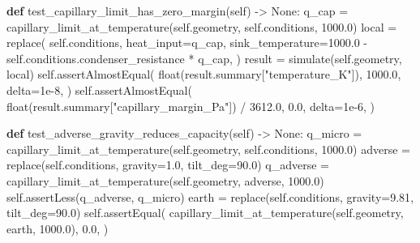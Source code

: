 \documentclass[
  12pt,
  12pt,a4paper,oneside]{report}
\newenvironment{Shaded}{}{}
\newcommand{\BuiltInTok}[1]{\textcolor[rgb]{0.00,0.50,0.00}{#1}}
\newcommand{\FloatTok}[1]{\textcolor[rgb]{0.25,0.63,0.44}{#1}}
\newcommand{\KeywordTok}[1]{\textcolor[rgb]{0.00,0.44,0.13}{\textbf{#1}}}
\newcommand{\NormalTok}[1]{#1}
\newcommand{\OperatorTok}[1]{\textcolor[rgb]{0.40,0.40,0.40}{#1}}
\newcommand{\StringTok}[1]{\textcolor[rgb]{0.25,0.44,0.63}{#1}}
\newcommand{\VariableTok}[1]{\textcolor[rgb]{0.10,0.09,0.49}{#1}}
\begin{document}
\begin{Shaded}
\begin{Highlighting}[]
    \KeywordTok{def}\NormalTok{ test\_capillary\_limit\_has\_zero\_margin(}\VariableTok{self}\NormalTok{) }\OperatorTok{{-}\textgreater{}} \VariableTok{None}\NormalTok{:}
\NormalTok{        q\_cap }\OperatorTok{=}\NormalTok{ capillary\_limit\_at\_temperature(}\VariableTok{self}\NormalTok{.geometry, }\VariableTok{self}\NormalTok{.conditions, }\FloatTok{1000.0}\NormalTok{)}
\NormalTok{        local }\OperatorTok{=}\NormalTok{ replace(}
            \VariableTok{self}\NormalTok{.conditions,}
\NormalTok{            heat\_input}\OperatorTok{=}\NormalTok{q\_cap,}
\NormalTok{            sink\_temperature}\OperatorTok{=}\FloatTok{1000.0} \OperatorTok{{-}} \VariableTok{self}\NormalTok{.conditions.condenser\_resistance }\OperatorTok{*}\NormalTok{ q\_cap,}
\NormalTok{        )}
\NormalTok{        result }\OperatorTok{=}\NormalTok{ simulate(}\VariableTok{self}\NormalTok{.geometry, local)}
        \VariableTok{self}\NormalTok{.assertAlmostEqual(}
            \BuiltInTok{float}\NormalTok{(result.summary[}\StringTok{"temperature\_K"}\NormalTok{]), }\FloatTok{1000.0}\NormalTok{, delta}\OperatorTok{=}\FloatTok{1e{-}8}\NormalTok{,}
\NormalTok{        )}
        \VariableTok{self}\NormalTok{.assertAlmostEqual(}
            \BuiltInTok{float}\NormalTok{(result.summary[}\StringTok{"capillary\_margin\_Pa"}\NormalTok{]) }\OperatorTok{/} \FloatTok{3612.0}\NormalTok{,}
            \FloatTok{0.0}\NormalTok{, delta}\OperatorTok{=}\FloatTok{1e{-}6}\NormalTok{,}
\NormalTok{        )}

    \KeywordTok{def}\NormalTok{ test\_adverse\_gravity\_reduces\_capacity(}\VariableTok{self}\NormalTok{) }\OperatorTok{{-}\textgreater{}} \VariableTok{None}\NormalTok{:}
\NormalTok{        q\_micro }\OperatorTok{=}\NormalTok{ capillary\_limit\_at\_temperature(}\VariableTok{self}\NormalTok{.geometry, }\VariableTok{self}\NormalTok{.conditions, }\FloatTok{1000.0}\NormalTok{)}
\NormalTok{        adverse }\OperatorTok{=}\NormalTok{ replace(}\VariableTok{self}\NormalTok{.conditions, gravity}\OperatorTok{=}\FloatTok{1.0}\NormalTok{, tilt\_deg}\OperatorTok{=}\FloatTok{90.0}\NormalTok{)}
\NormalTok{        q\_adverse }\OperatorTok{=}\NormalTok{ capillary\_limit\_at\_temperature(}\VariableTok{self}\NormalTok{.geometry, adverse, }\FloatTok{1000.0}\NormalTok{)}
        \VariableTok{self}\NormalTok{.assertLess(q\_adverse, q\_micro)}
\NormalTok{        earth }\OperatorTok{=}\NormalTok{ replace(}\VariableTok{self}\NormalTok{.conditions, gravity}\OperatorTok{=}\FloatTok{9.81}\NormalTok{, tilt\_deg}\OperatorTok{=}\FloatTok{90.0}\NormalTok{)}
        \VariableTok{self}\NormalTok{.assertEqual(}
\NormalTok{            capillary\_limit\_at\_temperature(}\VariableTok{self}\NormalTok{.geometry, earth, }\FloatTok{1000.0}\NormalTok{), }\FloatTok{0.0}\NormalTok{,}
\NormalTok{        )}


\end{Highlighting}
\end{Shaded}
\end{document}
